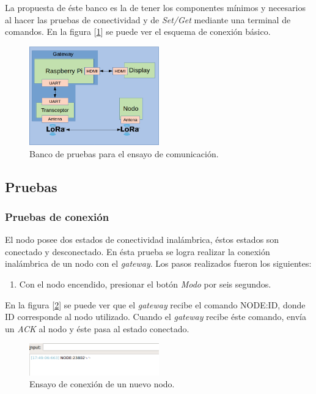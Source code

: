 La propuesta de éste banco es la de tener los componentes mínimos y necesarios al hacer las pruebas de conectividad y de {\textit{Set/Get}} mediante una terminal de comandos. En la figura [\ref{fig:bancodepruebas1}] se puede ver el esquema de conexión básico.

\begin{figure}[ht!]
	\centering
	\includegraphics[width=0.5\textwidth]{./Figures/bancodepruebas.png}
	\caption{Banco de pruebas para el ensayo de comunicación.}
	\label{fig:bancodepruebas1}
\end{figure}

\subsection{Pruebas}

\subsubsection{Pruebas de conexión}
El nodo posee dos estados de conectividad inalámbrica, éstos estados son conectado y desconectado. En ésta prueba se logra realizar la conexión inalámbrica de un nodo con el {\textit{gateway}}. Los pasos realizados fueron los siguientes:

\begin{enumerate}
\item Con el nodo encendido, presionar el botón {\textit{Modo}} por seis segundos.
\end{enumerate}

En la figura [\ref{fig:conexion}] se puede ver que el {\textit{gateway}} recibe el comando NODE:ID, donde ID corresponde al nodo utilizado. Cuando el {\textit{gateway}} recibe éste comando, envía un {\textit{ACK}} al nodo y éste pasa al estado conectado.

\begin{figure}[h!]
	\centering
	\includegraphics[width=0.5\textwidth]{./Figures/conexion.png}
	\caption{Ensayo de conexión de un nuevo nodo.}
	\label{fig:conexion}
\end{figure}

